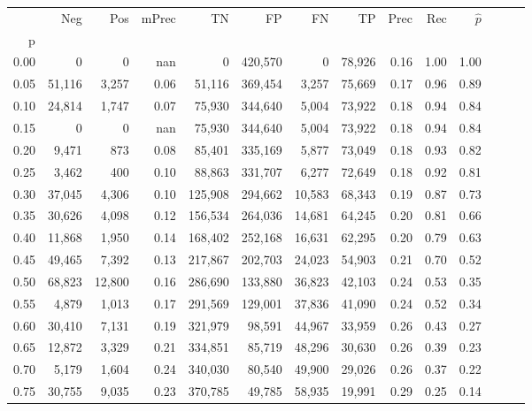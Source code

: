 \begin{tabular}{rrrrrrrrrrrrrr}
\toprule
{} &     Neg &     Pos & mPrec &       TN &       FP &      FN &      TP &  Prec &   Rec & $\hat{p}$ \\
p    &         &         &       &          &          &         &         &       &       &           \\
\midrule
0.00 &       0 &       0 &   nan &        0 &  420,570 &       0 &  78,926 &  0.16 &  1.00 &      1.00 \\
0.05 &  51,116 &   3,257 &  0.06 &   51,116 &  369,454 &   3,257 &  75,669 &  0.17 &  0.96 &      0.89 \\
0.10 &  24,814 &   1,747 &  0.07 &   75,930 &  344,640 &   5,004 &  73,922 &  0.18 &  0.94 &      0.84 \\
0.15 &       0 &       0 &   nan &   75,930 &  344,640 &   5,004 &  73,922 &  0.18 &  0.94 &      0.84 \\
0.20 &   9,471 &     873 &  0.08 &   85,401 &  335,169 &   5,877 &  73,049 &  0.18 &  0.93 &      0.82 \\
0.25 &   3,462 &     400 &  0.10 &   88,863 &  331,707 &   6,277 &  72,649 &  0.18 &  0.92 &      0.81 \\
0.30 &  37,045 &   4,306 &  0.10 &  125,908 &  294,662 &  10,583 &  68,343 &  0.19 &  0.87 &      0.73 \\
0.35 &  30,626 &   4,098 &  0.12 &  156,534 &  264,036 &  14,681 &  64,245 &  0.20 &  0.81 &      0.66 \\
0.40 &  11,868 &   1,950 &  0.14 &  168,402 &  252,168 &  16,631 &  62,295 &  0.20 &  0.79 &      0.63 \\
0.45 &  49,465 &   7,392 &  0.13 &  217,867 &  202,703 &  24,023 &  54,903 &  0.21 &  0.70 &      0.52 \\
0.50 &  68,823 &  12,800 &  0.16 &  286,690 &  133,880 &  36,823 &  42,103 &  0.24 &  0.53 &      0.35 \\
0.55 &   4,879 &   1,013 &  0.17 &  291,569 &  129,001 &  37,836 &  41,090 &  0.24 &  0.52 &      0.34 \\
0.60 &  30,410 &   7,131 &  0.19 &  321,979 &   98,591 &  44,967 &  33,959 &  0.26 &  0.43 &      0.27 \\
0.65 &  12,872 &   3,329 &  0.21 &  334,851 &   85,719 &  48,296 &  30,630 &  0.26 &  0.39 &      0.23 \\
0.70 &   5,179 &   1,604 &  0.24 &  340,030 &   80,540 &  49,900 &  29,026 &  0.26 &  0.37 &      0.22 \\
0.75 &  30,755 &   9,035 &  0.23 &  370,785 &   49,785 &  58,935 &  19,991 &  0.29 &  0.25 &      0.14 \\

\end{tabular}
